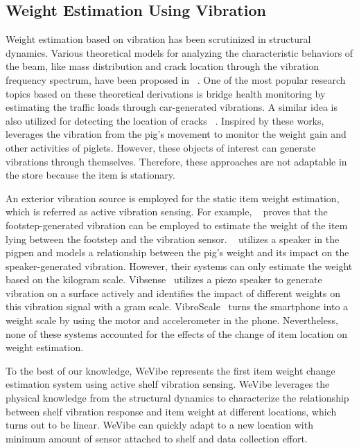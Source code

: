 \subsection{Weight Estimation Using Vibration}
Weight estimation based on vibration has been scrutinized in structural dynamics. Various theoretical models for analyzing the characteristic behaviors of the beam, like mass distribution and crack location through the vibration frequency spectrum, have been proposed in ~\cite{low2003natural,liu2020diagnosis,Matsumoto2003Mathematical,wynne2022quantifying}. One of the most popular research topics based on these theoretical derivations is bridge health monitoring by estimating the traffic loads through car-generated vibrations\cite{sekiya2018simplified,obrien2020using,yu2016state,liu2023telecomtm}. A similar idea is also utilized for detecting the location of cracks ~\cite{liu2020damage,nguyen2010multi}. Inspired by these works, ~\cite{bonde2021pignet, dong2023pigsense} leverages the vibration from the pig's movement to monitor the weight gain and other activities of piglets. However, these objects of interest can generate vibrations through themselves. Therefore, these approaches are not adaptable in the store because the item is stationary.

An exterior vibration source is employed for the static item weight estimation, which is referred as active vibration sensing. For example, ~\cite{mirshekari2021obstruction} proves that the footstep-generated vibration can be employed to estimate the weight of the item lying between the footstep and the vibration sensor. ~\cite{codling2021masshog} utilizes a speaker in the pigpen and models a relationship between the pig's weight and its impact on the speaker-generated vibration. However, their systems can only estimate the weight based on the kilogram scale. Vibsense~\cite{liu2017vibsense} utilizes a piezo speaker to generate vibration on a surface actively and identifies the impact of different weights on this vibration signal with a gram scale. VibroScale~\cite{zhang2020vibroscale} turns the smartphone into a weight scale by using the motor and accelerometer in the phone. Nevertheless, none of these systems accounted for the effects of the change of item location on weight estimation. 

To the best of our knowledge, WeVibe represents the first item weight change estimation system using active shelf vibration sensing. WeVibe leverages the physical knowledge from the structural dynamics to characterize the relationship between shelf vibration response and item weight at different locations, which turns out to be linear. WeVibe can quickly adapt to a new location with minimum amount of sensor attached to shelf and data collection effort. 
